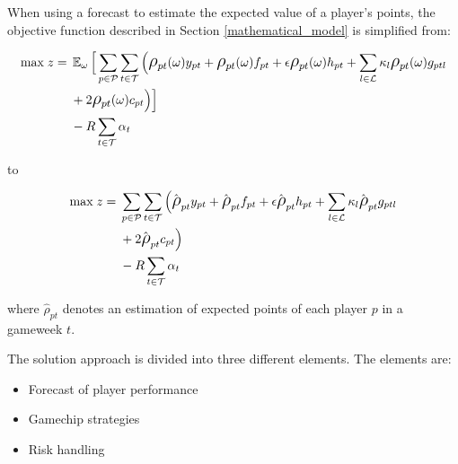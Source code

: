 When using a forecast to estimate the expected value of a player's points, the objective function described in Section \ref{mathematical_model} is simplified from: 

\begin{equation*}
\smaller
\begin{aligned}
\text{max} \; z ={} & \EX_{\omega} \Big\lbrack\sum\limits_{p \in \mathcal{P}} \sum\limits_{t \in \mathcal{T}} \Big( \mathlarger{\rho}_{pt}(\omega)y_{pt} + \mathlarger{\rho}_{pt}(\omega)f_{pt} + \epsilon  \mathlarger{\rho}_{pt}(\omega)h_{pt} + \sum_{l \in \mathcal{L}}\kappa_{l} \mathlarger{\rho}_{pt}(\omega)g_{ptl} \\ 
&  + 2 \mathlarger{\rho}_{pt}(\omega)c_{pt} \Big)  \Big\rbrack \\ 
& - R\sum_{t \in \mathcal{T}}\alpha_{t}
\end{aligned}
\end{equation*}

to 

\begin{equation*}
\smaller
\begin{aligned}
\text{max} \; z ={} &  \sum\limits_{p \in \mathcal{P}} \sum\limits_{t \in \mathcal{T}} \Big( \hat{\mathlarger{\rho}}_{pt} y_{pt} + \hat{\mathlarger{\rho}}_{pt} f_{pt} + \epsilon  \hat{\mathlarger{\rho}}_{pt} h_{pt} + \sum_{l \in \mathcal{L}}\kappa_{l} \hat{\mathlarger{\rho}}_{pt} g_{ptl} \\ 
& + 2 \hat{\mathlarger{\rho}}_{pt} c_{pt} \Big)  \\ 
& - R\sum_{t \in \mathcal{T}}\alpha_{t}
\end{aligned}
\end{equation*}


where $\hat{\rho}_{pt}$ denotes an estimation of expected points of each player $p$ in a gameweek $t$.

\newpar

The solution approach is divided into three different elements. The elements are:

\begin{itemize}
    \item Forecast of player performance
    \item Gamechip strategies
    \item Risk handling
\end{itemize}

